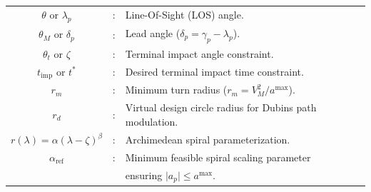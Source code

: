 \begin{enumerate}
\begin{tabular}{cll}
        $\theta$ or $\lambda_p$ &:& Line-Of-Sight (LOS) angle.\\
        $\theta_M$ or $\delta_p$ &:& Lead angle ($\delta_p = \gamma_p - \lambda_p$).\\
        $\theta_t$ or $\zeta$ &:& Terminal impact angle constraint.\\
        $t_{\text{imp}}$ or $t^*$ &:& Desired terminal impact time constraint.\\
        $r_m$ &:& Minimum turn radius ($r_m = V_M^2 / a^{\text{max}}$).\\
        $r_d$ &:& Virtual design circle radius for Dubins path modulation.\\
        $r(\lambda) = \alpha(\lambda - \zeta)^\beta$ &:& Archimedean spiral parameterization.\\
        $\alpha_{\text{ref}}$ &:& Minimum feasible spiral scaling parameter \\
        & & ensuring $\vert{}a_p\vert{} \le a^{\text{max}}$.\\
        \end{tabular}
\end{enumerate}
\cleardoublepage
{}
